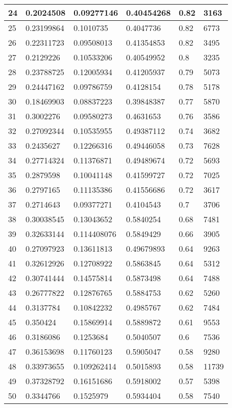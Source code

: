 \begin{longtable}{|l|l|l|l|l|l|}
24 & 0.2024508 & 0.09277146 & 0.40454268 & 0.82 & 3163 \\ \hline 
25 & 0.23199864 & 0.1010735 & 0.4047736 & 0.82 & 6773 \\ \hline 
26 & 0.22311723 & 0.09508013 & 0.41354853 & 0.82 & 3495 \\ \hline 
27 & 0.2129226 & 0.10533206 & 0.40549952 & 0.8 & 3235 \\ \hline 
28 & 0.23788725 & 0.12005934 & 0.41205937 & 0.79 & 5073 \\ \hline 
29 & 0.24447162 & 0.09786759 & 0.4128154 & 0.78 & 5178 \\ \hline 
30 & 0.18469903 & 0.08837223 & 0.39848387 & 0.77 & 5870 \\ \hline 
31 & 0.3002276 & 0.09580273 & 0.4631653 & 0.76 & 3586 \\ \hline 
32 & 0.27092344 & 0.10535955 & 0.49387112 & 0.74 & 3682 \\ \hline 
33 & 0.2435627 & 0.12266316 & 0.49446058 & 0.73 & 7628 \\ \hline 
34 & 0.27714324 & 0.11376871 & 0.49489674 & 0.72 & 5693 \\ \hline 
35 & 0.2879598 & 0.10041148 & 0.41599727 & 0.72 & 7025 \\ \hline 
36 & 0.2797165 & 0.11135386 & 0.41556686 & 0.72 & 3617 \\ \hline 
37 & 0.2714643 & 0.09377271 & 0.4104543 & 0.7 & 3706 \\ \hline 
38 & 0.30038545 & 0.13043652 & 0.5840254 & 0.68 & 7481 \\ \hline 
39 & 0.32633144 & 0.114408076 & 0.5849429 & 0.66 & 3905 \\ \hline 
40 & 0.27097923 & 0.13611813 & 0.49679893 & 0.64 & 9263 \\ \hline 
41 & 0.32612926 & 0.12708922 & 0.5863845 & 0.64 & 5312 \\ \hline 
42 & 0.30741444 & 0.14575814 & 0.5873498 & 0.64 & 7488 \\ \hline 
43 & 0.26777822 & 0.12876765 & 0.5884753 & 0.62 & 5260 \\ \hline 
44 & 0.3137784 & 0.10842232 & 0.4985767 & 0.62 & 7484 \\ \hline 
45 & 0.350424 & 0.15869914 & 0.5889872 & 0.61 & 9553 \\ \hline 
46 & 0.3186086 & 0.1253684 & 0.5040507 & 0.6 & 7536 \\ \hline 
47 & 0.36153698 & 0.11760123 & 0.5905047 & 0.58 & 9280 \\ \hline 
48 & 0.33973655 & 0.109262414 & 0.5015893 & 0.58 & 11739 \\ \hline 
49 & 0.37328792 & 0.16151686 & 0.5918002 & 0.57 & 5398 \\ \hline 
50 & 0.3344766 & 0.1525979 & 0.5934404 & 0.58 & 7540 \\ \hline 
\end{longtable}